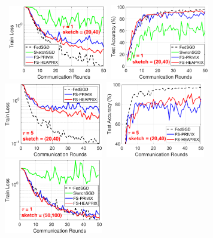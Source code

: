 \documentclass[twoside]{article}
\begin{document}
\begin{figure}[t]
	\begin{center}
		\mbox{\hspace{-0.15in}			   
		\includegraphics[width=1.7in]{MNIST_figures/local1_sketch20_iid0_train_loss.eps} \hspace{-0.12in}
		\includegraphics[width=1.7in]{MNIST_figures/local1_sketch20_iid0_test_acc.eps} 
		}
		\mbox{\hspace{-0.15in}	
		\includegraphics[width=1.7in]{MNIST_figures/local5_sketch20_iid0_train_loss.eps} \hspace{-0.12in}
		\includegraphics[width=1.7in]{MNIST_figures/local5_sketch20_iid0_test_acc.eps}
		}
		\mbox{\hspace{-0.15in}	
		 \includegraphics[width=1.7in]{MNIST_figures/local1_sketch50_iid0_train_loss.eps} \hspace{-0.12in}
}
\end{center}
\end{figure}
\end{document}
